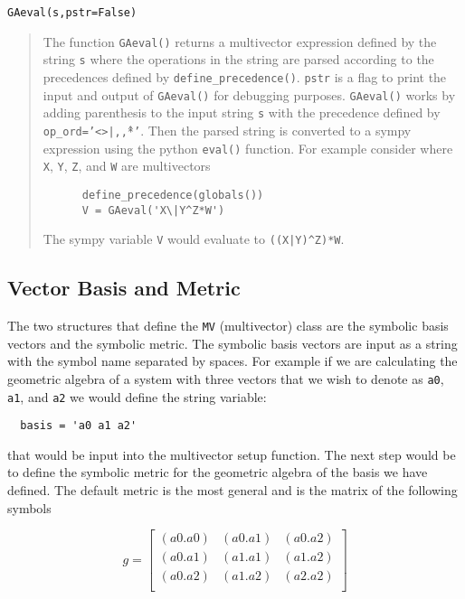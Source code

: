 \documentclass[10pt]{article}
\newcommand{\lbrk}{\left [}
\newcommand{\rbrk}{\right ]}
\newcommand{\T}[1]{\texttt{#1}}
\begin{document}
   \T{GAeval(s,pstr=False)}
   \begin{quote}
   The function \T{GAeval()} returns a multivector expression defined by the
   string \T{s} where the operations in the string are parsed according to
   the precedences defined by \T{define\_precedence()}. \T{pstr} is a flag
   to print the input and output of \T{GAeval()} for debugging purposes.
   \T{GAeval()} works by adding parenthesis to the input string \T{s} with the
   precedence defined by \T{op\_ord='<>|,\^,*'}.  Then the parsed string is
   converted to a sympy expression using the python \T{eval()} function.
   For example consider where \T{X}, \T{Y}, \T{Z}, and \T{W} are multivectors

	\begin{lstlisting}
      define_precedence(globals())
      V = GAeval('X\|Y^Z*W')
	\end{lstlisting}
	
   The sympy variable \T{V} would evaluate to \lstinline!((X|Y)^Z)*W!.
   \end{quote}

\subsection{Vector Basis and Metric}\label{BasisMetric}

The two structures that define the \T{MV} (multivector) class are the
symbolic basis vectors and the symbolic metric.  The symbolic basis
vectors are input as a string with the symbol name separated by spaces.  For
example if we are calculating the geometric algebra of a system with three
vectors that we wish to denote as \T{a0}, \T{a1}, and \T{a2} we would define the
string variable:

\begin{lstlisting}
  basis = 'a0 a1 a2'
\end{lstlisting}  

that would be input into the multivector setup function.  The next step would be
to define the symbolic metric for the geometric algebra of the basis we
have defined. The default metric is the most general and is the matrix of
the following symbols

  \begin{equation}\label{metric}
  g = \lbrk
  \begin{array}{ccc}
    (a0.a0)   & (a0.a1)  & (a0.a2) \\
    (a0.a1) & (a1.a1)  & (a1.a2) \\
    (a0.a2) & (a1.a2) & (a2.a2) \\
  \end{array}
  \rbrk
  \end{equation}
\end{document}
